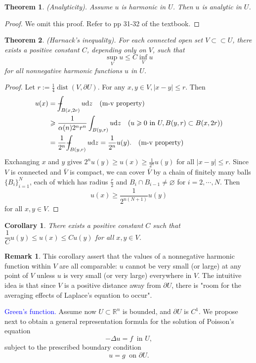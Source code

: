 \documentclass[hyperref,UTF8,12pt]{article}
\numberwithin{equation}{subsection}
\theoremstyle{plain}
\newtheorem{theorem}{Theorem}
\newtheorem{corollary}{Corollary}
\theoremstyle{definition}
\newtheorem{remark}{Remark}
\numberwithin{theorem}{section}
\numberwithin{lemma}{section}
\numberwithin{proposition}{section}
\numberwithin{remark}{section}
\numberwithin{corollary}{section}
\numberwithin{definition}{section}
\numberwithin{problem}{section}
\numberwithin{example}{section}
\def\dif{\textup{d}}
\def\Xint#1{\mathchoice
	{\XXint\displaystyle\textstyle{#1}}%
	{\XXint\textstyle\scriptstyle{#1}}%
	{\XXint\scriptstyle\scriptscriptstyle{#1}}%
	{\XXint\scriptscriptstyle\scriptscriptstyle{#1}}%
	\!\int}
\def\XXint#1#2#3{{\setbox0=\hbox{$#1{#2#3}{\int}$ }
		\vcenter{\hbox{$#2#3$ }}\kern-.55\wd0}}
\def\dashint{\Xint-}
\newcommand{\ptl}{\partial}
\newcommand{\mr}{\mathbb{R}}
\renewcommand{\leq}{\leqslant}
\renewcommand{\geq}{\geqslant}
\begin{document}
\begin{theorem}\label{thm2.10}
(Analyticity). Assume $u$ is harmonic in $U$. Then $u$ is analytic in $U$.
\end{theorem}
\begin{proof}
We omit this proof. Refer to pp 31-32 of the textbook.
\end{proof}
\begin{theorem}\label{thm2.11}
(Harnack's inequality). For each connected open set $V\subset\subset U$, there exists a positive constant $C$, depending only on $V$, such that
\[\sup_Vu\leq C\inf _Vu\]for all nonnegative harmonic functions $u$ in $U$.
\end{theorem}
\begin{proof}
Let $r:=\frac{1}{4}\operatorname{dist}(V,\ptl U)$. For any $x,y\in V,|x-y|\leq r$. Then
\[\begin{aligned}
	u(x)&=\dashint_{B(x,2r)}u\dif z\quad(\text{m-v property})\\
	&\geq\frac{1}{\alpha(n)2^nr^n}\int_{B(y,r)}u\dif z\quad(u\geq0~\text{in }U, B(y,r)\subset B(x,2r))\\
	&=\frac{1}{2^n}\dashint_{B(y,r)}u\dif z=\frac{1}{2^n}u(y).\quad(\text{m-v property})
\end{aligned}\]
Exchanging $x$ and $y$ gives $2^nu(y)\geq u(x)\geq\frac{1}{2^n}u(y)$ for all $|x-y|\leq r$.
Since $V$ is connected and $\bar{V}$ is compact, we can cover $\bar{V}$ by a chain of finitely many balls $\{B_i\}_{i=1}^N$, each of which has radius $\frac{r}{2}$ and $B_i\cap B_{i-1}\neq\varnothing$ for $i=2,\cdots,N$. Then
\[u(x)\geq\frac{1}{2^{n(N+1)}}u(y)\]for all $x,y\in V$.
\end{proof}
\begin{corollary}
There exists a positive constant $C$ such that $\dfrac{1}{C}u(y) \leq u(x)\leq Cu(y)$ for all $x,y\in V$.
\end{corollary}
\begin{remark}
This corollary assert that the values of a nonnegative harmonic function within $V$ are all comparable: $u$ cannot be very small (or large) at any point of $V$ unless $u$ is very small (or very large) everywhere in $V$. The intuitive idea is that since $V$ is a positive distance away from $\ptl U$, there is "room for the averaging effects of Laplace's equation to occur".
\end{remark}

\noindent\textcolor{blue}{Green's function.} Assume now $U\subset\mr^n$ is bounded, and $\ptl U$ is $C^1$. We propose next to obtain a general representation formula for the solution of Poisson's equation \[-\Delta u=f~\text{~in } U,\]
subject to the prescribed boundary condition \[u=g~\text{~on } \ptl U.\]
\end{document}
